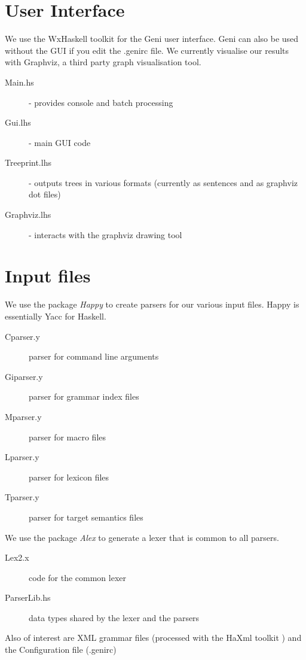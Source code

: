 \documentclass[11pt]{report}
\begin{document}
\section{User Interface}

We use the WxHaskell toolkit for the Geni user interface.  Geni
can also be used without the GUI if you edit the .genirc file.
We currently visualise our results with Graphviz, a third party graph
visualisation tool.

\begin{description}
 \item[Main.hs] - provides console and batch processing 
 \item[Gui.lhs] - main GUI code 
 \item[Treeprint.lhs] - outputs trees in various formats 
                        (currently as sentences and as graphviz dot
                        files)
 \item[Graphviz.lhs] - interacts with the graphviz drawing tool
\end{description}

\section{Input files}

We use the package \textit{Happy} to create parsers for our various
input files.  Happy is essentially Yacc for Haskell.

\begin{description}
 \item[Cparser.y] parser for command line arguments
 \item[Giparser.y] parser for grammar index files
 \item[Mparser.y] parser for macro files 
 \item[Lparser.y] parser for lexicon files 
 \item[Tparser.y] parser for target semantics files 
\end{description}

We use the package \textit{Alex} to generate a lexer that is common to
all parsers.

\begin{description}
 \item[Lex2.x] code for the common lexer
 \item[ParserLib.hs] data types shared by the lexer and the parsers 
\end{description}

Also of interest are XML grammar files (processed with the HaXml toolkit
) and the Configuration file (.genirc)
\end{document}
